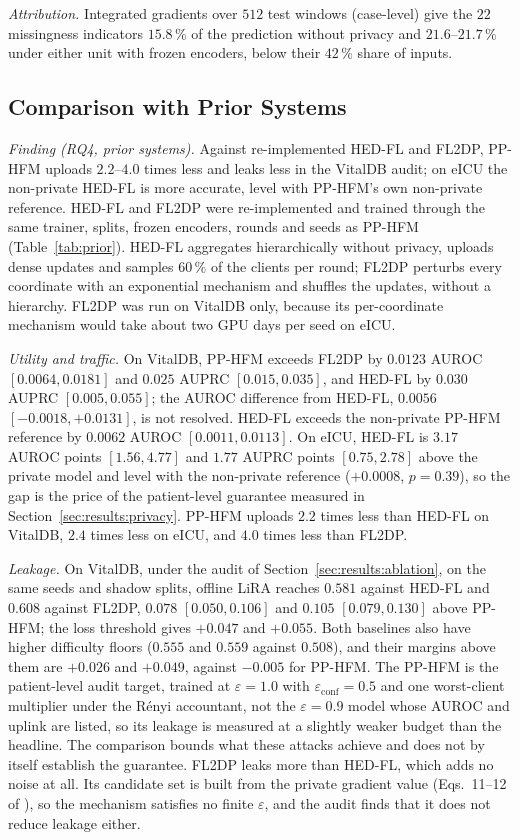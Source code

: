 \emph{Attribution.} Integrated gradients over $512$ test windows (case-level)
give the
$22$ missingness indicators $15.8\,\%$ of the prediction without privacy and
$21.6$--$21.7\,\%$ under either unit with frozen encoders, below their
$42\,\%$ share of inputs.

\subsection{Comparison with Prior Systems}
\label{sec:results:prior}
\emph{Finding (RQ4, prior systems).} Against re-implemented HED-FL and FL2DP,
PP-HFM uploads $2.2$--$4.0$ times less and leaks less in the VitalDB audit; on
eICU the non-private HED-FL is more accurate, level with PP-HFM's own
non-private reference. HED-FL \cite{ref3} and FL2DP \cite{ref9} were
re-implemented and trained
through the same trainer, splits, frozen encoders, rounds and seeds as
PP-HFM (Table~\ref{tab:prior}). HED-FL aggregates hierarchically without
privacy, uploads dense updates and samples $60\,\%$ of the clients per round;
FL2DP perturbs every coordinate with an exponential mechanism and shuffles the
updates, without a hierarchy. FL2DP was run on VitalDB only, because its
per-coordinate mechanism would take about two GPU days per seed on eICU.

\emph{Utility and traffic.} On VitalDB, PP-HFM exceeds FL2DP by $0.0123$
AUROC $[0.0064, 0.0181]$ and $0.025$ AUPRC $[0.015, 0.035]$, and HED-FL by
$0.030$ AUPRC $[0.005, 0.055]$; the AUROC difference from HED-FL, $0.0056$
$[-0.0018, +0.0131]$, is not resolved. HED-FL exceeds the non-private PP-HFM
reference by $0.0062$ AUROC $[0.0011, 0.0113]$.
On eICU, HED-FL is $3.17$ AUROC points $[1.56, 4.77]$ and $1.77$ AUPRC points
$[0.75, 2.78]$ above the private model and level with the non-private
reference ($+0.0008$, $p = 0.39$), so the gap is the price of the
patient-level guarantee measured in Section~\ref{sec:results:privacy}. PP-HFM
uploads $2.2$ times less than HED-FL on VitalDB, $2.4$ times less on eICU, and
$4.0$ times less than FL2DP.

\emph{Leakage.} On VitalDB, under the audit of
Section~\ref{sec:results:ablation}, on the same seeds and shadow splits, offline LiRA reaches $0.581$ against HED-FL
and $0.608$ against FL2DP, $0.078$ $[0.050, 0.106]$ and $0.105$
$[0.079, 0.130]$ above PP-HFM; the loss threshold gives $+0.047$ and
$+0.055$. Both baselines also have higher difficulty floors ($0.555$ and
$0.559$ against $0.508$), and their margins above them are $+0.026$ and
$+0.049$, against $-0.005$ for PP-HFM. The PP-HFM is the patient-level audit target, trained at $\varepsilon = 1.0$ with $\varepsilon_{\mathrm{conf}} = 0.5$ and one worst-client multiplier under the R\'enyi accountant, not the $\varepsilon = 0.9$ model whose AUROC and uplink are listed, so its leakage is measured at a slightly weaker budget than the headline. The comparison bounds what these attacks achieve and does not by itself establish the guarantee. FL2DP leaks more than HED-FL, which adds no noise at all.
Its candidate set is built from the private gradient value
(Eqs.~11--12 of \cite{ref9}), so the mechanism satisfies no finite
$\varepsilon$, and the audit finds that it does not reduce leakage either.

